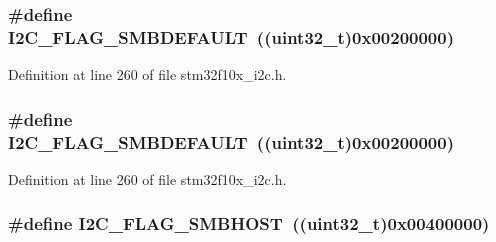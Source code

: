 \subsubsection[{\texorpdfstring{I2\+C\+\_\+\+F\+L\+A\+G\+\_\+\+S\+M\+B\+D\+E\+F\+A\+U\+LT}{I2C_FLAG_SMBDEFAULT}}]{\setlength{\rightskip}{0pt plus 5cm}\#define I2\+C\+\_\+\+F\+L\+A\+G\+\_\+\+S\+M\+B\+D\+E\+F\+A\+U\+LT~(({\bf uint32\+\_\+t})0x00200000)}\hypertarget{group___i2_c__flags__definition_ga371fb29861d1cd41736253e804c67ad5}{}\label{group___i2_c__flags__definition_ga371fb29861d1cd41736253e804c67ad5}


Definition at line 260 of file stm32f10x\+\_\+i2c.\+h.

\subsubsection[{\texorpdfstring{I2\+C\+\_\+\+F\+L\+A\+G\+\_\+\+S\+M\+B\+D\+E\+F\+A\+U\+LT}{I2C_FLAG_SMBDEFAULT}}]{\setlength{\rightskip}{0pt plus 5cm}\#define I2\+C\+\_\+\+F\+L\+A\+G\+\_\+\+S\+M\+B\+D\+E\+F\+A\+U\+LT~(({\bf uint32\+\_\+t})0x00200000)}\hypertarget{group___i2_c__flags__definition_ga371fb29861d1cd41736253e804c67ad5}{}\label{group___i2_c__flags__definition_ga371fb29861d1cd41736253e804c67ad5}


Definition at line 260 of file stm32f10x\+\_\+i2c.\+h.

\subsubsection[{\texorpdfstring{I2\+C\+\_\+\+F\+L\+A\+G\+\_\+\+S\+M\+B\+H\+O\+ST}{I2C_FLAG_SMBHOST}}]{\setlength{\rightskip}{0pt plus 5cm}\#define I2\+C\+\_\+\+F\+L\+A\+G\+\_\+\+S\+M\+B\+H\+O\+ST~(({\bf uint32\+\_\+t})0x00400000)}\hypertarget{group___i2_c__flags__definition_gaf15403a1852f39aaadbb8942ba98d97e}{}\label{group___i2_c__flags__definition_gaf15403a1852f39aaadbb8942ba98d97e}


